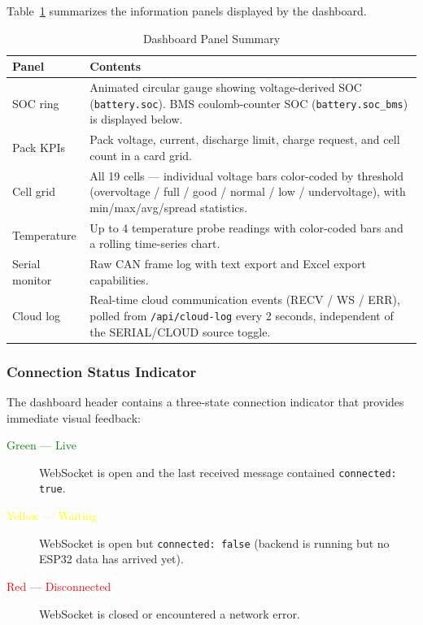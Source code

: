 Table~\ref{tab:cloud-dashboard-panels} summarizes the information panels displayed by the dashboard.

\begin{table}[h]
    \centering
    \caption{Dashboard Panel Summary}
    \label{tab:cloud-dashboard-panels}
    \begin{tabular}{lp{9cm}}
        \toprule
        \textbf{Panel} & \textbf{Contents} \\
        \midrule
        SOC ring        & Animated circular gauge showing voltage-derived SOC (\texttt{battery.soc}). BMS coulomb-counter SOC (\texttt{battery.soc\_bms}) is displayed below. \\
        Pack KPIs       & Pack voltage, current, discharge limit, charge request, and cell count in a card grid. \\
        Cell grid       & All 19 cells — individual voltage bars color-coded by threshold (overvoltage / full / good / normal / low / undervoltage), with min/max/avg/spread statistics. \\
        Temperature     & Up to 4 temperature probe readings with color-coded bars and a rolling time-series chart. \\
        Serial monitor  & Raw CAN frame log with text export and Excel export capabilities. \\
        Cloud log       & Real-time cloud communication events (RECV / WS / ERR), polled from \texttt{/api/cloud-log} every 2 seconds, independent of the SERIAL/CLOUD source toggle. \\
        \bottomrule
    \end{tabular}
\end{table}

\subsubsection{Connection Status Indicator}

The dashboard header contains a three-state connection indicator that provides immediate visual feedback:

\begin{description}
    \item[\textcolor{green}{Green — Live}] WebSocket is open and the last received message contained \texttt{connected: true}.
    \item[\textcolor{yellow}{Yellow — Waiting}] WebSocket is open but \texttt{connected: false} (backend is running but no ESP32 data has arrived yet).
    \item[\textcolor{red}{Red — Disconnected}] WebSocket is closed or encountered a network error.
\end{description}

